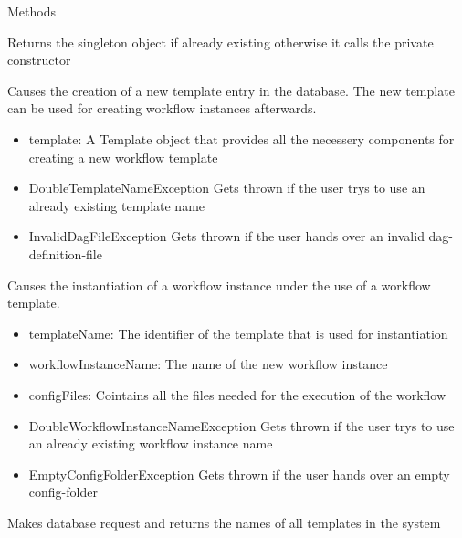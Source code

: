 \begin{methodenv}{Methods}

Returns the singleton object if already existing otherwise it calls the private constructor

Causes the creation of a new template entry in the database. The new template can be used for creating workflow instances afterwards.

\begin{itemize}
	\item{template:}
	A Template object that provides all the necessery components for creating a new workflow template
\end{itemize}

\begin{itemize}
	\item{DoubleTemplateNameException}
	Gets thrown if the user trys to use an already existing template name
	\item{InvalidDagFileException}
	Gets thrown if the user hands over an invalid dag-definition-file
\end{itemize}

Causes the instantiation of a workflow instance under the use of a workflow template. 

\begin{itemize}
	\item{templateName:}
	The identifier of the template that is used for instantiation
	\item{workflowInstanceName:}
	The name of the new workflow instance
	\item{configFiles:}
	Cointains all the files needed for the execution of the workflow
\end{itemize}

\begin{itemize}
	\item{DoubleWorkflowInstanceNameException}
	Gets thrown if the user trys to use an already existing workflow instance name
	\item{EmptyConfigFolderException}
	Gets thrown if the user hands over an empty config-folder
\end{itemize}

Makes database request and returns the names of all templates in the system


\end{methodenv}
